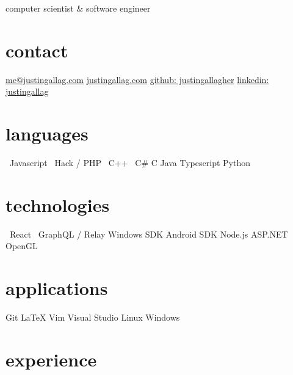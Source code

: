 \documentclass[print]{template/friggeri-cv}
\newcommand{\starr}{\raisebox{0.2ex}{$\star $}}
\begin{document}
    {computer scientist \& software engineer}

    \begin{aside}
        \section{contact}
            \href{mailto:me@justingallag.com}{me@justingallag.com}
            \href{http://justingallag.com}{justingallag.com}
            \href{https://github.com/justingallagher}{github: justingallagher}
            \href{https://www.linkedin.com/in/justingallag}{linkedin: justingallag} \vspace{\parsep}
        \section{languages}
            \starr \ Javascript
            \starr \ Hack / PHP
            \starr \ C++
            \starr \ C\#
            C
            Java
            Typescript
            Python \vspace{\parsep}
        \section{technologies}
            \starr\ React
            \starr\ GraphQL / Relay
            Windows SDK
            Android SDK
            Node.js
            ASP.NET
            OpenGL \vspace{\parsep}
        \section{applications}
            Git
            LaTeX
            Vim
            Visual Studio
            Linux
            Windows \vspace{\parsep}
    \end{aside}

    \section{experience}
\end{document}
